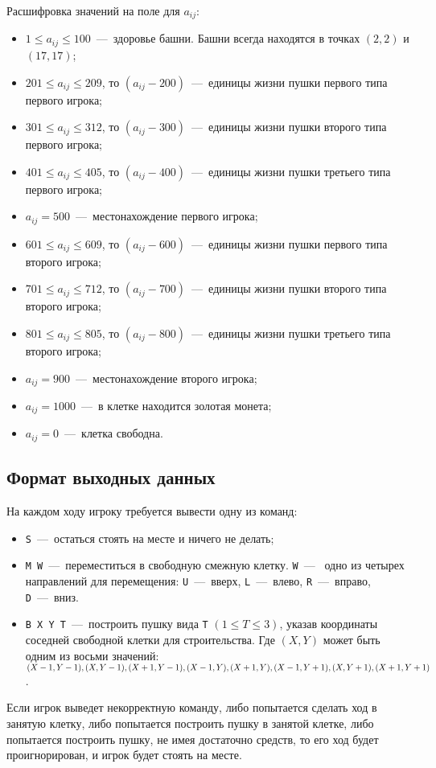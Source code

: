 \documentclass[14pt]{extarticle}
\begin{document}
Расшифровка значений на поле для $a_{ij}$:
\begin{itemize}
    \item $1 \leq a_{ij} \leq 100$~---~здоровье башни. Башни всегда находятся в точках $(2, 2)$ и $(17, 17)$;
    \item $201 \leq a_{ij} \leq 209$, то $(a_{ij} - 200)$~---~единицы жизни пушки первого типа первого игрока;
    \item $301 \leq a_{ij} \leq 312$, то $(a_{ij} - 300)$~---~единицы жизни пушки второго типа первого игрока;
    \item $401 \leq a_{ij} \leq 405$, то $(a_{ij} - 400)$~---~единицы жизни пушки третьего типа первого игрока;
    \item $a_{ij} = 500$~---~местонахождение первого игрока;
    \item $601 \leq a_{ij} \leq 609$, то $(a_{ij} - 600)$~---~единицы жизни пушки первого типа второго игрока;
    \item $701 \leq a_{ij} \leq 712$, то $(a_{ij} - 700)$~---~единицы жизни пушки второго типа второго игрока;
    \item $801 \leq a_{ij} \leq 805$, то $(a_{ij} - 800)$~---~единицы жизни пушки третьего типа второго игрока;
    \item $a_{ij} = 900$~---~местонахождение второго игрока;
    \item $a_{ij} = 1000$~---~в клетке находится золотая монета;
    \item $a_{ij} = 0$~---~клетка свободна.
\end{itemize}

\subsection*{Формат выходных данных}
На каждом ходу игроку требуется вывести одну из команд:
\begin{itemize}
    \item \texttt{S}~---~остаться стоять на месте и ничего не делать;
    \item \texttt{M W}~---~переместиться в свободную смежную клетку. \texttt{W}~---~ одно из четырех направлений для перемещения: \texttt{U}~---~вверх, \texttt{L}~---~влево, \texttt{R}~---~вправо, \texttt{D}~---~вниз.
    \item \texttt{B X Y T}~---~построить пушку вида \texttt{T} $(1 \leq T \leq 3)$, указав координаты соседней свободной клетки для строительства. Где $(X, Y)$ может быть одним из восьми значений: $(X - 1, Y - 1), (X, Y - 1), (X + 1, Y - 1), (X - 1, Y), \\ (X + 1, Y), (X - 1, Y + 1), (X, Y + 1), (X + 1, Y + 1)$.
\end{itemize}

Если игрок выведет некорректную команду, либо попытается сделать ход в занятую клетку, либо попытается построить пушку в занятой клетке, либо попытается построить пушку, не имея достаточно средств, то его ход будет проигнорирован, и игрок будет стоять на месте.
\end{document}
